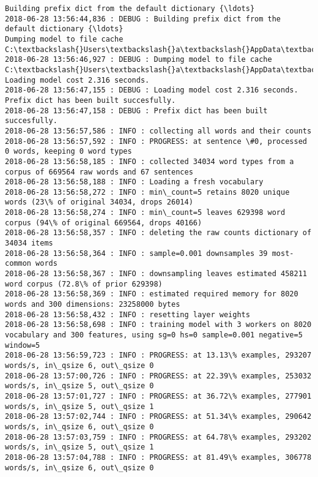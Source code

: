\documentclass[11pt]{article}
\begin{document}
    \begin{Verbatim}[commandchars=\\\{\}]
Building prefix dict from the default dictionary {\ldots}
2018-06-28 13:56:44,836 : DEBUG : Building prefix dict from the default dictionary {\ldots}
Dumping model to file cache C:\textbackslash{}Users\textbackslash{}a\textbackslash{}AppData\textbackslash{}Local\textbackslash{}Temp\textbackslash{}jieba.cache
2018-06-28 13:56:46,927 : DEBUG : Dumping model to file cache C:\textbackslash{}Users\textbackslash{}a\textbackslash{}AppData\textbackslash{}Local\textbackslash{}Temp\textbackslash{}jieba.cache
Loading model cost 2.316 seconds.
2018-06-28 13:56:47,155 : DEBUG : Loading model cost 2.316 seconds.
Prefix dict has been built succesfully.
2018-06-28 13:56:47,158 : DEBUG : Prefix dict has been built succesfully.
2018-06-28 13:56:57,586 : INFO : collecting all words and their counts
2018-06-28 13:56:57,592 : INFO : PROGRESS: at sentence \#0, processed 0 words, keeping 0 word types
2018-06-28 13:56:58,185 : INFO : collected 34034 word types from a corpus of 669564 raw words and 67 sentences
2018-06-28 13:56:58,188 : INFO : Loading a fresh vocabulary
2018-06-28 13:56:58,272 : INFO : min\_count=5 retains 8020 unique words (23\% of original 34034, drops 26014)
2018-06-28 13:56:58,274 : INFO : min\_count=5 leaves 629398 word corpus (94\% of original 669564, drops 40166)
2018-06-28 13:56:58,357 : INFO : deleting the raw counts dictionary of 34034 items
2018-06-28 13:56:58,364 : INFO : sample=0.001 downsamples 39 most-common words
2018-06-28 13:56:58,367 : INFO : downsampling leaves estimated 458211 word corpus (72.8\% of prior 629398)
2018-06-28 13:56:58,369 : INFO : estimated required memory for 8020 words and 300 dimensions: 23258000 bytes
2018-06-28 13:56:58,432 : INFO : resetting layer weights
2018-06-28 13:56:58,698 : INFO : training model with 3 workers on 8020 vocabulary and 300 features, using sg=0 hs=0 sample=0.001 negative=5 window=5
2018-06-28 13:56:59,723 : INFO : PROGRESS: at 13.13\% examples, 293207 words/s, in\_qsize 6, out\_qsize 0
2018-06-28 13:57:00,726 : INFO : PROGRESS: at 22.39\% examples, 253032 words/s, in\_qsize 5, out\_qsize 0
2018-06-28 13:57:01,727 : INFO : PROGRESS: at 36.72\% examples, 277901 words/s, in\_qsize 5, out\_qsize 1
2018-06-28 13:57:02,744 : INFO : PROGRESS: at 51.34\% examples, 290642 words/s, in\_qsize 6, out\_qsize 0
2018-06-28 13:57:03,759 : INFO : PROGRESS: at 64.78\% examples, 293202 words/s, in\_qsize 5, out\_qsize 1
2018-06-28 13:57:04,788 : INFO : PROGRESS: at 81.49\% examples, 306778 words/s, in\_qsize 6, out\_qsize 0

\end{Verbatim}
\end{document}
